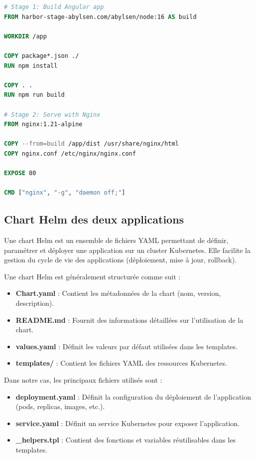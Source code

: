 \begin{lstlisting}[language=Dockerfile, caption=Dockerfile du Frontend]
# Stage 1: Build Angular app
FROM harbor-stage-abylsen.com/abylsen/node:16 AS build

WORKDIR /app

COPY package*.json ./
RUN npm install

COPY . .
RUN npm run build

# Stage 2: Serve with Nginx
FROM nginx:1.21-alpine

COPY --from=build /app/dist /usr/share/nginx/html
COPY nginx.conf /etc/nginx/nginx.conf

EXPOSE 80

CMD ["nginx", "-g", "daemon off;"]
\end{lstlisting}

\subsection*{Chart Helm des deux applications}

Une chart Helm est un ensemble de fichiers YAML permettant de définir, paramétrer et déployer une application sur un cluster Kubernetes. Elle facilite la gestion du cycle de vie des applications (déploiement, mise à jour, rollback).

Une chart Helm est généralement structurée comme suit :

\begin{itemize}
    \item \textbf{Chart.yaml} : Contient les métadonnées de la chart (nom, version, description).
    \item \textbf{README.md} : Fournit des informations détaillées sur l’utilisation de la chart.
    \item \textbf{values.yaml} : Définit les valeurs par défaut utilisées dans les templates.
    \item \textbf{templates/} : Contient les fichiers YAML des ressources Kubernetes.
\end{itemize}

Dans notre cas, les principaux fichiers utilisés sont :

\begin{itemize}
    \item \textbf{deployment.yaml} : Définit la configuration du déploiement de l’application (pods, replicas, images, etc.).
    \item \textbf{service.yaml} : Définit un service Kubernetes pour exposer l’application.
    \item \textbf{\_helpers.tpl} : Contient des fonctions et variables réutilisables dans les templates.
\end{itemize}

